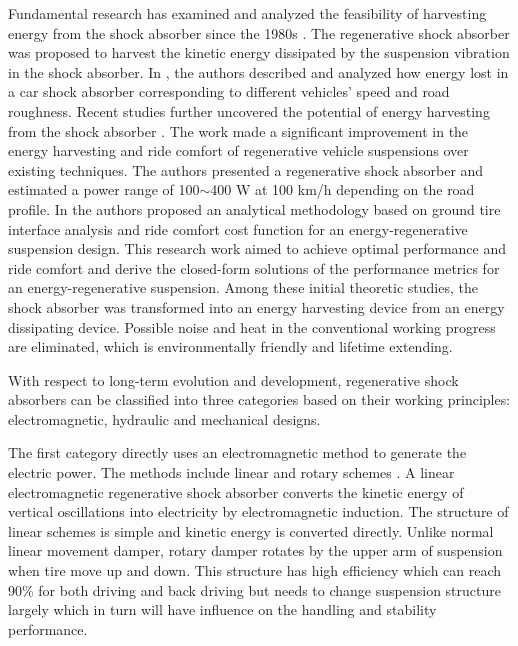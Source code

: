 Fundamental research has examined and analyzed the feasibility of harvesting energy from the shock absorber since the 1980s \cite{JX_ref1}.
The regenerative shock absorber was proposed to harvest the kinetic energy dissipated by the suspension vibration in the shock absorber.
In \cite{JX_ref1}, the authors described and analyzed how energy lost in a car shock absorber corresponding to different vehicles' speed and road roughness.
Recent studies further uncovered the potential of energy harvesting from the shock absorber \cite{JX_JOUR,JX_HUANG201516}.
The work \cite{JX_JOUR} made a significant improvement in the energy harvesting and ride comfort of regenerative vehicle suspensions over existing techniques.
The authors presented a regenerative shock absorber and estimated a power range of 100$\sim$400 W at 100 km/h depending on the road profile.
In \cite{JX_HUANG201516} the authors proposed an analytical methodology based on ground tire interface analysis and ride comfort cost function for an energy-regenerative suspension design.
This research work aimed to achieve optimal performance and ride comfort and derive the closed-form solutions of the performance metrics for an energy-regenerative suspension.
Among these initial theoretic studies, the shock absorber was transformed into an energy harvesting device from an energy dissipating device.
Possible noise and heat in the conventional working progress are eliminated, which is environmentally friendly and lifetime extending.

With respect to long-term evolution and development, regenerative shock absorbers can be classified into three categories based on their working principles: electromagnetic, hydraulic and mechanical designs.

The first category directly uses an electromagnetic method to generate the electric power.
The methods include linear \cite{JX_0964-1726-19-4-045003,JX_5737802,JX_ZHANG20121124,JX_2619394820151001,JX_XIE2015385} and rotary schemes \cite{JX_6063995,JX_6023317}.
A linear electromagnetic regenerative shock absorber converts the kinetic energy of vertical oscillations into electricity by electromagnetic induction.
The structure of linear schemes is simple and kinetic energy is converted directly.
Unlike normal linear movement damper, rotary damper rotates by the upper arm of suspension when tire move up and down.
This structure has high efficiency which can reach 90\% for both driving and back driving but needs to change suspension structure largely which in turn will have influence on the handling and stability performance.

